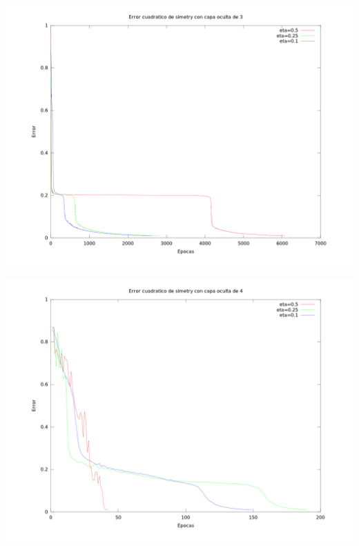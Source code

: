 \documentclass{article}
\begin{document}
\begin{center}
  \includegraphics[scale=0.35]{../../doc/results/cuadErrorsimetry_l3.png}

  \includegraphics[scale=0.35]{../../doc/results/cuadErrorsimetry_l4.png}
\end{center}
\end{document}
